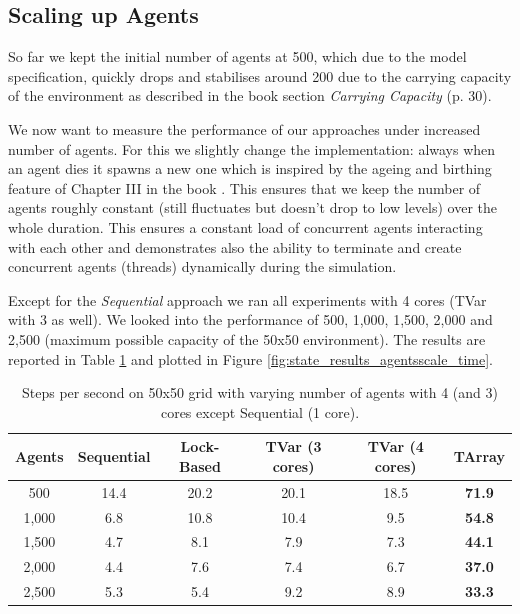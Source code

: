 \subsection{Scaling up Agents}
So far we kept the initial number of agents at 500, which due to the model specification, quickly drops and stabilises around 200 due to the carrying capacity of the environment as described in the book \cite{epstein_growing_1996} section \textit{Carrying Capacity} (p. 30).

We now want to measure the performance of our approaches under increased number of agents. For this we slightly change the implementation: always when an agent dies it spawns a new one which is inspired by the ageing and birthing feature of Chapter III in the book \cite{epstein_growing_1996}. This ensures that we keep the number of agents roughly constant (still fluctuates but doesn't drop to low levels) over the whole duration. This ensures a constant load of concurrent agents interacting with each other and demonstrates also the ability to terminate and create concurrent agents (threads) dynamically during the simulation.

Except for the \textit{Sequential} approach we ran all experiments with 4 cores (TVar with 3 as well). We looked into the performance of 500, 1,000, 1,500, 2,000 and 2,500 (maximum possible capacity of the 50x50 environment). The results are reported in Table \ref{tab:state_results_agentsscale_time} and plotted in Figure \ref{fig:state_results_agentsscale_time}.

\begin{table}
	\centering
  	\begin{tabular}{ c || c | c | c | c | c }
        Agents  & Sequential & Lock-Based & TVar (3 cores) & TVar (4 cores) & TArray  \\ \hline \hline 
    	    500     & 14.4       & 20.2		  &	20.1           & 18.5       	& \textbf{71.9}    \\ \hline
   		1,000   & 6.8        & 10.8 	      & 10.4           & 9.5         & \textbf{54.8}    \\ \hline
   		1,500   & 4.7        & 8.1 		  & 7.9            & 7.3			& \textbf{44.1}    \\ \hline
   		2,000   & 4.4        & 7.6 		  & 7.4            & 6.7    		& \textbf{37.0}    \\ \hline 
   		2,500   & 5.3        & 5.4 		  & 9.2            & 8.9			& \textbf{33.3}    \\ \hline \hline
   	\end{tabular}
  	
  	\caption{Steps per second on 50x50 grid with varying number of agents with 4 (and 3) cores except Sequential (1 core).}
	\label{tab:state_results_agentsscale_time}
\end{table}

